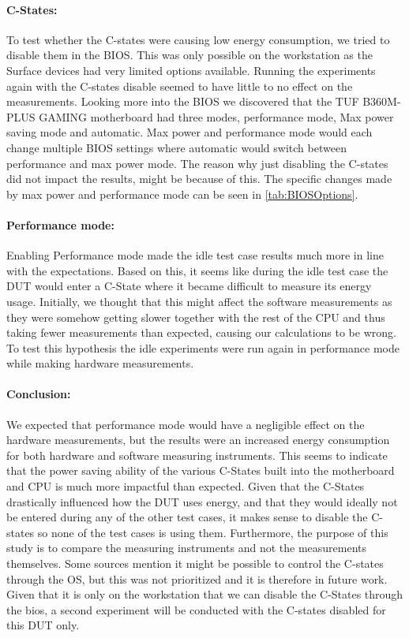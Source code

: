 \paragraph{C-States:} To test whether the C-states were causing low energy consumption, we tried to disable them in the BIOS. This was only possible on the workstation as the Surface devices had very limited options available. Running the experiments again with the C-states disable seemed to have little to no effect on the measurements. Looking more into the BIOS we discovered that the TUF B360M-PLUS GAMING motherboard had three modes, performance mode, Max power saving mode and automatic. Max power and performance mode would each change multiple BIOS settings where automatic would switch between performance and max power mode. The reason why just disabling the C-states did not impact the results, might be because of this. The specific changes made by max power and performance mode can be seen in \cref{tab:BIOSOptions}.



\paragraph{Performance mode:} Enabling Performance mode made the idle test case results much more in line with the expectations. Based on this, it seems like during the idle test case the DUT would enter a C-State where it became difficult to measure its energy usage. Initially, we thought that this might affect the software measurements as they were somehow getting slower together with the rest of the CPU and thus taking fewer measurements than expected, causing our calculations to be wrong. To test this hypothesis the idle experiments were run again in performance mode while making hardware measurements. 

\paragraph{Conclusion:} We expected that performance mode would have a negligible effect on the hardware measurements, but the results were an increased energy consumption for both hardware and software measuring instruments. This seems to indicate that the power saving ability of the various C-States built into the motherboard and CPU is much more impactful than expected. Given that the C-States drastically influenced how the DUT uses energy, and that they would ideally not be entered during any of the other test cases, it makes sense to disable the C-states so none of the test cases is using them. Furthermore, the purpose of this study is to compare the measuring instruments and not the measurements themselves. Some sources mention it might be possible to control the C-states through the OS\cite{CMete,CLinux}, but this was not prioritized and it is therefore in future work. Given that it is only on the workstation that we can disable the C-States through the bios, a second experiment will be conducted with the C-states disabled for this DUT only.